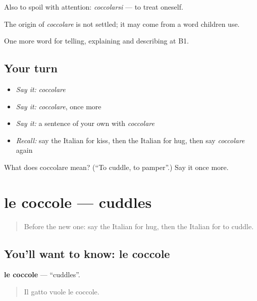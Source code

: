 Also to spoil with attention: \emph{coccolarsi} — to treat oneself.

\begin{cousinweb}
The origin of \emph{coccolare} is not settled; it may come from a word children use.
\end{cousinweb}

\begin{grammarlens}[title={What you've built}]
One more word for telling, explaining and describing at B1.
\end{grammarlens}

\subsection*{Your turn}
\begin{itemize}
\raggedright
  \item \emph{Say it:} \emph{coccolare}
  \item \emph{Say it:} \emph{coccolare}, once more
  \item \emph{Say it:} a sentence of your own with \emph{coccolare}
  \item \emph{Recall:} say the Italian for kiss, then the Italian for hug, then say \emph{coccolare} again
\end{itemize}

\begin{tcolorbox}[breakable,colback=teal!4,colframe=teal!35!black,title={Before you move on}]
What does coccolare mean? (\textquotedblleft{}To cuddle, to pamper\textquotedblright{}.) Say it once more.
\end{tcolorbox}
\section[le coccole]{le coccole — cuddles}

\label{lesson:IT-C492-coccole}



\begin{quote}
Before the new one: say the Italian for hug, then the Italian for to cuddle.
\end{quote}

\subsection*{You'll want to know: le coccole}
\textbf{le coccole} — \textquotedblleft{}cuddles\textquotedblright{}.

\begin{quote}
Il gatto vuole le coccole.
\end{quote}

